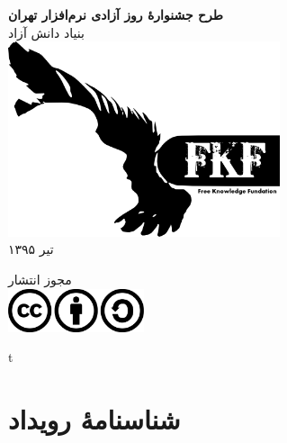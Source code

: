 \documentclass{article}
\begin{document}
\itemsep5mm \parskip2pt 

\thispagestyle{empty}

\vspace*{2cm}
\begin{center}
{\huge
\textbf{
طرح جشنوارهٔ روز آزادی نرم‌افزار تهران
}
\\[1cm]}
{\Large
بنیاد دانش آزاد
}
{\large
\\[1cm]
\baselineskip=1cm
\includegraphics[width=8cm]{images/logo.png}
\\[.4cm]
تیر ۱۳۹۵
\\[.4cm]

}


{\large
مجوز انتشار
\\[.4cm]

\Large
\includegraphics[width=4cm]{images/cc-by-sa-license.png}

}

\end{center}


\newpage
\thispagestyle{empty}
\vspace*{\fill}
\begin{center}
\Bes
\Huge
t
\end{center}
\vspace*{\fill}


\newpage
\thispagestyle{empty}
\tableofcontents %




\newpage
\vspace*{2cm}

\section{شناسنامهٔ رویداد}
\end{document}
